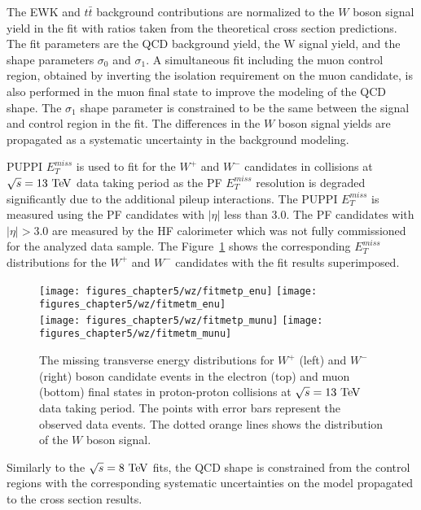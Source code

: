 The EWK and $t\bar{t}$ background contributions are normalized to the $W$ boson signal yield in the fit with ratios taken from the theoretical cross section predictions. The fit parameters are the QCD background yield, the W signal yield, and the shape parameters $\sigma_0$ and $\sigma_1$. A simultaneous fit including the muon control region, obtained by inverting the isolation requirement on the muon candidate, is also performed in the muon final state to improve the modeling of the QCD shape. The $\sigma_1$ shape parameter is constrained to be the same between the signal and control region in the fit. The differences in the $W$ boson signal yields are propagated as a systematic uncertainty in the background modeling.    
 
PUPPI $E_{T}^{miss}$ is used to fit for the $W^{+}$ and $W^{-}$ candidates in collisions at $\sqrt{s}=13~\mathrm{Te\kern -0.1em V}$ data taking period as the PF $E_{T}^{miss}$ resolution is degraded significantly due to the additional pileup interactions. The PUPPI $E_{T}^{miss}$ is measured using the PF candidates with $|\eta|$ less than $3.0$. The PF candidates with $|\eta|>3.0$ are measured by the HF calorimeter which was not fully commissioned for the analyzed data sample. The  Figure~\ref{fig:W13} shows the corresponding $E_{T}^{miss}$ distributions for the $W^{+}$ and $W^{-}$ candidates with the fit results superimposed.
\begin{figure}[htbp]
\centering
\texttt{[image: figures\_chapter5/wz/fitmetp\_enu]}
\texttt{[image: figures\_chapter5/wz/fitmetm\_enu]}\\
\texttt{[image: figures\_chapter5/wz/fitmetp\_munu]}
\texttt{[image: figures\_chapter5/wz/fitmetm\_munu]}
\caption{The missing transverse energy distributions for $W^+$  (left) and $W^-$  (right) boson candidate events in the electron (top) and muon (bottom) final states in proton-proton collisions at $\sqrt{s}=13~\mathrm{Te\kern -0.1em V}$ data taking period. The points with error bars represent the observed data events. The dotted orange lines shows the distribution of the $W$ boson signal. 
\label{fig:W13}}
\end{figure}
Similarly to the $\sqrt{s}=8~\mathrm{Te\kern -0.1em V}$ fits, the QCD shape is constrained from the control regions with the corresponding systematic uncertainties on the model propagated to the cross section results. 

